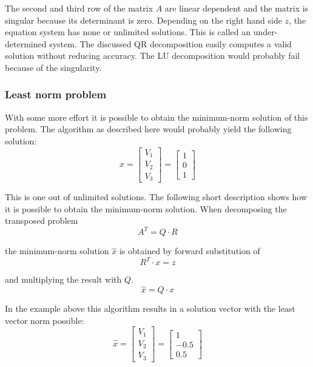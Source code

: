 The second and third row of the matrix $A$ are linear dependent and
the matrix is singular because its determinant is zero.  Depending on
the right hand side $z$, the equation system has none or unlimited
solutions.  This is called an under-determined system.  The discussed
QR decomposition easily computes a valid solution without reducing
accuracy.  The LU decomposition would probably fail because of the
singularity.

\subsubsection{Least norm problem}

With some more effort it is possible to obtain the minimum-norm
solution of this problem.  The algorithm as described here would
probably yield the following solution:
\begin{equation}
x =
\begin{bmatrix}
V_1\\
V_2\\
V_3
\end{bmatrix}
=
\begin{bmatrix}
1\\
0\\
1
\end{bmatrix}
\end{equation}

This is one out of unlimited solutions.  The following short
description shows how it is possible to obtain the minimum-norm
solution.  When decomposing the transposed problem
\begin{equation}
A^T = Q\cdot R
\end{equation}

the minimum-norm solution $\hat{x}$ is obtained by forward substitution of
\begin{equation}
R^T\cdot x = z
\end{equation}

and multiplying the result with $Q$.
\begin{equation}
\hat{x} = Q\cdot x
\end{equation}

In the example above this algorithm results in a solution vector with
the least vector norm possible:
\begin{equation}
\hat{x} =
\begin{bmatrix}
V_1\\
V_2\\
V_3
\end{bmatrix}
=
\begin{bmatrix}
1\\
-0.5\\
0.5
\end{bmatrix}
\end{equation}

